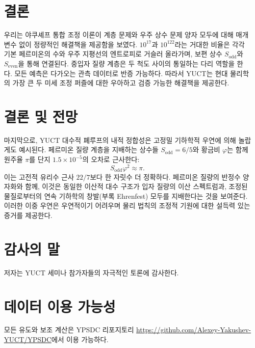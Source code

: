 \documentclass[11pt,a4paper]{article}
\theoremstyle{remark}
\begin{document}
	\section{결론}
	
	우리는 야쿠셰프 통합 조정 이론이 계층 문제와 우주 상수 문제 양자 모두에 대해 매개변수 없이 정량적인 해결책을 제공함을 보였다. \(10^{17}\)과 \(10^{122}\)라는 거대한 비율은 각각 기본 페르미온의 수와 우주 지평선의 엔트로피로 거슬러 올라가며, 보편 상수 \(S_{\mathrm{odd}}\)와 \(S_{\mathrm{even}}\)을 통해 연결된다. 중입자 질량 계층은 두 척도 사이의 통일하는 다리 역할을 한다. 모든 예측은 다가오는 관측 데이터로 반증 가능하다. 따라서 YUCT는 현대 물리학의 가장 큰 두 미세 조정 퍼즐에 대한 우아하고 검증 가능한 해결책을 제공한다.
	
	\section*{결론 및 전망}
	
	마지막으로, YUCT 대수적 폐루프의 내적 정합성은 고정밀 기하학적 우연에 의해 놀랍게도 예시된다. 페르미온 질량 계층을 지배하는 상수들 \(S_{\mathrm{odd}}=6/5\)와 황금비 \(\varphi\)는 함께 원주율 \(\pi\)를 단지 \(1.5\times10^{-5}\)의 오차로 근사한다:
	\[
	S_{\mathrm{odd}}\varphi^2 \approx \pi .
	\]
	이는 고전적 유리수 근사 \(22/7\)보다 한 자릿수 더 정확하다. 페르미온 질량의 반정수 양자화와 함께, 이것은 동일한 이산적 대수 구조가 입자 질량의 이산 스펙트럼과, 조정된 물질로부터의 연속 기하학의 창발(부록 Ehrenfest) 모두를 지배한다는 것을 보여준다. 이러한 이중 우연은 우연적이기 어려우며 물리 법칙의 조정적 기원에 대한 설득력 있는 증거를 제공한다.
	
	\section*{감사의 말}
	
	저자는 YUCT 세미나 참가자들의 자극적인 토론에 감사한다.
	
	\section*{데이터 이용 가능성}
	
	모든 유도와 보조 계산은 YPSDC 리포지토리 \url{https://github.com/Alexey-Yakushev-YUCT/YPSDC}에서 이용 가능하다.
	
\end{document}
